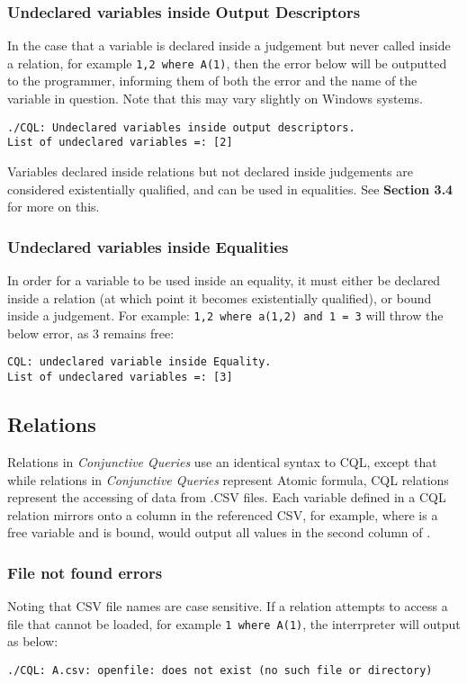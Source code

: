 \subsubsection{Undeclared variables inside Output Descriptors}
In the case that a variable is declared inside a judgement but never called inside a relation, for example \lstinline!1,2 where A(1)!, then the error below will be outputted to the programmer, informing them of both the error and the name of the variable in question. Note that this may vary slightly on Windows systems.
\begin{lstlisting}[style=framed]
./CQL: Undeclared variables inside output descriptors.
List of undeclared variables =: [2]
\end{lstlisting}
Variables declared inside relations but not declared inside judgements are considered existentially qualified, and can be used in equalities. See \textbf{Section 3.4} for more on this.

\subsubsection{Undeclared variables inside Equalities}
In order for a variable to be used inside an equality, it must either be declared inside a relation (at which point it becomes existentially qualified), or bound inside a judgement. For example: \lstinline!1,2 where a(1,2) and 1 = 3! will throw the below error, as 3 remains free:
\begin{lstlisting}[style=framed]
CQL: undeclared variable inside Equality.
List of undeclared variables =: [3]
\end{lstlisting}

\subsection{Relations}
Relations in \textit{Conjunctive Queries} use an identical syntax to CQL, except that while relations in \textit{Conjunctive Queries} represent Atomic formula, CQL relations represent the accessing of data from .CSV files.  Each variable defined in a CQL relation mirrors onto a column in the referenced CSV, for example,  where  is a free variable and  is bound, would output all values in the second column of . 

\subsubsection{File not found errors}
Noting that CSV file names are case sensitive. If a relation attempts to access a file that cannot be loaded, for example \lstinline!1 where A(1)!, the interrpreter will output as below:
\begin{lstlisting}[style=framed]
./CQL: A.csv: openfile: does not exist (no such file or directory)
\end{lstlisting}


